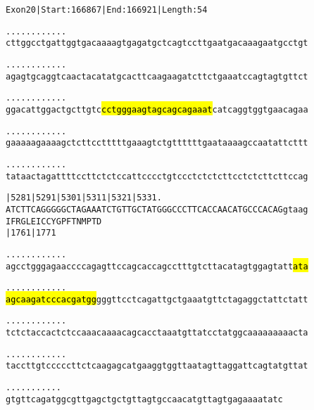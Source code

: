\documentclass{article}
\begin{document}
\begin{alltt}
Exon 20 | Start: 166867 | End: 166921 | Length: 54

.    .    .    .    .    .    .    .    .    .    .    .    
cttggcctgattggtgacaaaagtgagatgctcagtccttgaatgacaaagaatgcctgt

.    .    .    .    .    .    .    .    .    .    .    .    
agagtgcaggtcaactacatatgcacttcaagaagatcttctgaaatccagtagtgttct

.    .    .    .    .    .    .    .    .    .    .    .    
ggacattggactgcttgtc\hl{cctgggaagtagcagcagaaat}catcaggtggtgaacagaa

.    .    .    .    .    .    .    .    .    .    .    .    
gaaaaagaaaagctcttcctttttgaaagtctgttttttgaataaaagccaatattcttt

.    .    .    .    .    .    .    .    .    .    .    .    
tataactagattttccttctctccattcccctgtccctctctcttcctctcttcttccag

   |5281     |5291     |5301     |5311     |5321     |5331 .
ATCTTCAGGGGGCTAGAAATCTGTTGCTATGGGCCCTTCACCAACATGCCCACAGgtaag
I  F  R  G  L  E  I  C  C  Y  G  P  F  T  N  M  P  T  D     
   |1761                         |1771                      

    .    .    .    .    .    .    .    .    .    .    .    .
agcctgggagaaccccagagttccagcaccagcctttgtcttacatagtggagtatt\hl{ata}

    .    .    .    .    .    .    .    .    .    .    .    .
\hl{agcaagatcccacgatgg}gggttcctcagattgctgaaatgttctagaggctattctatt

    .    .    .    .    .    .    .    .    .    .    .    .
tctctaccactctccaaacaaaacagcacctaaatgttatcctatggcaaaaaaaaacta

    .    .    .    .    .    .    .    .    .    .    .    .
taccttgtcccccttctcaagagcatgaaggtggttaatagttaggattcagtatgttat

    .    .    .    .    .    .    .    .    .    .    .
gtgttcagatggcgttgagctgctgttagtgccaacatgttagtgagaaaatatc
\end{alltt}
\newpage
\end{document}
